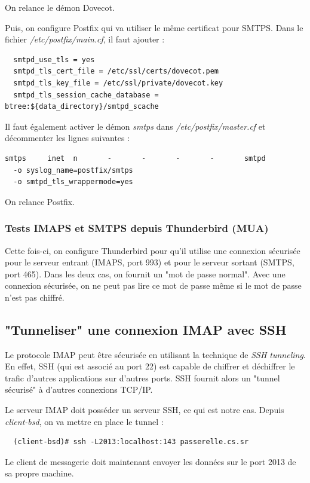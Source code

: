 \documentclass[a4paper]{article}
\begin{document}
On relance le démon Dovecot.

Puis, on configure Postfix qui va utiliser le même certificat pour SMTPS.
Dans le fichier \textit{/etc/postfix/main.cf}, il faut ajouter :
\begin{verbatim}
  smtpd_use_tls = yes
  smtpd_tls_cert_file = /etc/ssl/certs/dovecot.pem
  smtpd_tls_key_file = /etc/ssl/private/dovecot.key
  smtpd_tls_session_cache_database = btree:${data_directory}/smtpd_scache
\end{verbatim}

Il faut également activer le démon \textit{smtps} dans \textit{/etc/postfix/master.cf}
et décommenter les lignes suivantes :
\begin{verbatim}
smtps     inet  n       -       -       -       -       smtpd
  -o syslog_name=postfix/smtps
  -o smtpd_tls_wrappermode=yes
\end{verbatim}

On relance Postfix.

\subsubsection{Tests IMAPS et SMTPS depuis Thunderbird (MUA)}

Cette fois-ci, on configure Thunderbird pour qu'il utilise
une connexion sécurisée pour le serveur entrant (IMAPS, port 993)
et pour le serveur sortant (SMTPS, port 465).
Dans les deux cas, on fournit un "mot de passe normal".
Avec une connexion sécurisée, on ne peut pas lire ce mot de passe même
si le mot de passe n'est pas chiffré.

\subsection{"Tunneliser" une connexion IMAP avec SSH}

Le protocole IMAP peut être sécurisée en utilisant la technique
de \textit{SSH tunneling}. En effet, SSH (qui est associé au port 22) est 
capable de chiffrer et déchiffrer le trafic d'autres applications sur
d'autres ports. SSH fournit alors un "tunnel sécurisé" à d'autres
connexions TCP/IP. 

Le serveur IMAP doit posséder un serveur SSH, ce qui est notre cas.
Depuis \textit{client-bsd}, on va mettre en place le tunnel :
\begin{verbatim}
  (client-bsd)# ssh -L2013:localhost:143 passerelle.cs.sr
\end{verbatim}

Le client de messagerie doit maintenant envoyer les données sur le port 2013
de sa propre machine. 
\end{document}
